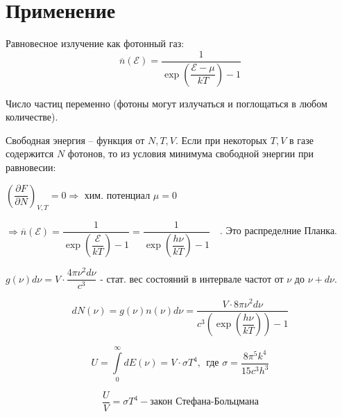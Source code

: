 \documentclass[a4paper, 12pt, openany]{book}
\begin{document}
	\section{Применение}
	\tab Равновесное излучение как фотонный газ:
	$$
	\overline{n}(\mathcal{E}) = \dfrac{1}{\exp\left( \dfrac{\mathcal{E} - \mu}{kT} \right) - 1}
	$$
	
	\tab Число частиц переменно (фотоны могут излучаться и поглощаться в любом количестве).
	
	\tab Свободная энергия -- функция от $N, T, V$. Если при некоторых $T, V$ в газе содержится $N$ фотонов, то из условия минимума свободной энергии при равновесии:
	
	\tab $\left( \dfrac{\partial F}{\partial N} \right)_{V, T} = 0 \Rightarrow$ хим. потенциал $\mu = 0$
	
	\tab $\Rightarrow \overline{n}(\mathcal{E}) = \dfrac{1}{\exp\left( \dfrac{\mathcal{E}}{kT} \right) - 1} = \dfrac{1}{\exp\left( \dfrac{h\nu}{kT} \right) - 1}$~~. Это распределние Планка.
	
	\tab $g(\nu) d \nu = V \cdot \dfrac{4 \pi \nu^2 d\nu}{c^3}$ - стат. вес состояний в интервале частот от $\nu$ до $\nu + d\nu$.
	
	$$dN(\nu) = g(\nu)n(\nu) d\nu = \dfrac{V \cdot 8 \pi \nu^2 d\nu}{c^3 \left(\exp\left( \dfrac{h\nu}{kT} \right)\right) - 1}$$
	
	$$U = \int\limits_0^\infty dE(\nu) = V \cdot \sigma T^4,~~ \text{где } \sigma = \dfrac{8 \pi^5 k^4}{15 c^3 h^3}$$
	
	$$\dfrac{U}{V} = \sigma T^4 - \text{закон Стефана-Больцмана} $$
	
\end{document}
